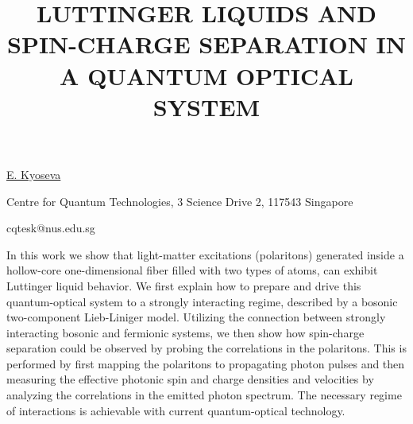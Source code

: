 \title{LUTTINGER LIQUIDS AND SPIN-CHARGE SEPARATION IN A QUANTUM OPTICAL SYSTEM}

\underline{E. Kyoseva}

{\normalsize{\vspace{-4mm}
Centre for Quantum Technologies, 3 Science Drive 2, 117543 Singapore

\email cqtesk@nus.edu.sg}}

In this work we show that light-matter excitations (polaritons) generated inside a hollow-core one-dimensional fiber filled with two types of atoms, can exhibit Luttinger liquid behavior. We first explain how to prepare and drive this quantum-optical system to a strongly interacting regime, described by a bosonic two-component Lieb-Liniger model. Utilizing the connection between strongly interacting bosonic and fermionic systems, we then show how spin-charge separation could be observed by probing the correlations in the polaritons. This is performed by first mapping the polaritons to propagating photon pulses and then measuring the effective photonic spin and charge densities and velocities by analyzing the correlations in the emitted photon spectrum. The necessary regime of interactions is achievable with current quantum-optical technology.

\vspace{\baselineskip} 